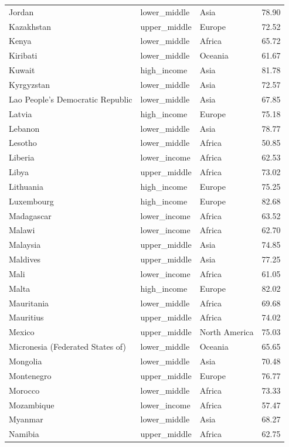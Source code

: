\documentclass[
  letterpaper,
  DIV=11,
  numbers=noendperiod]{scrartcl}
\begin{document}
\begin{longtable}[t]{llll}
Jordan & lower\_middle & Asia & 78.90\\
\addlinespace
Kazakhstan & upper\_middle & Europe & 72.52\\
Kenya & lower\_middle & Africa & 65.72\\
Kiribati & lower\_middle & Oceania & 61.67\\
Kuwait & high\_income & Asia & 81.78\\
Kyrgyzstan & lower\_middle & Asia & 72.57\\
\addlinespace
Lao People's Democratic Republic & lower\_middle & Asia & 67.85\\
Latvia & high\_income & Europe & 75.18\\
Lebanon & lower\_middle & Asia & 78.77\\
Lesotho & lower\_middle & Africa & 50.85\\
Liberia & lower\_income & Africa & 62.53\\
\addlinespace
Libya & upper\_middle & Africa & 73.02\\
Lithuania & high\_income & Europe & 75.25\\
Luxembourg & high\_income & Europe & 82.68\\
Madagascar & lower\_income & Africa & 63.52\\
Malawi & lower\_income & Africa & 62.70\\
\addlinespace
Malaysia & upper\_middle & Asia & 74.85\\
Maldives & upper\_middle & Asia & 77.25\\
Mali & lower\_income & Africa & 61.05\\
Malta & high\_income & Europe & 82.02\\
Mauritania & lower\_middle & Africa & 69.68\\
\addlinespace
Mauritius & upper\_middle & Africa & 74.02\\
Mexico & upper\_middle & North America & 75.03\\
Micronesia (Federated States of) & lower\_middle & Oceania & 65.65\\
Mongolia & lower\_middle & Asia & 70.48\\
Montenegro & upper\_middle & Europe & 76.77\\
\addlinespace
Morocco & lower\_middle & Africa & 73.33\\
Mozambique & lower\_income & Africa & 57.47\\
Myanmar & lower\_middle & Asia & 68.27\\
Namibia & upper\_middle & Africa & 62.75\\

\end{longtable}
\end{document}
